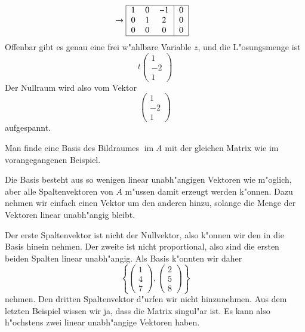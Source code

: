 \begin{beispiel}
\begin{align*}
&\rightarrow
\begin{tabular}{|>{$}c<{$}>{$}c<{$}>{$}c<{$}|>{$}c<{$}|}
\hline
 1& 0& -1&0\\
 0& 1&  2&0\\
 0& 0&  0&0\\
\hline
\end{tabular}
\end{align*}
Offenbar gibt es genau eine frei w"ahlbare Variable $z$, und
die L"osungsmenge ist 
\[
t\begin{pmatrix}
1\\-2\\1
\end{pmatrix}
\]
Der Nullraum wird also vom Vektor
\[
\begin{pmatrix}
1\\-2\\1
\end{pmatrix}
\]
aufgespannt.
\end{beispiel}

\begin{beispiel}
Man finde eine Basis des Bildraumes $\operatorname{im}A$ mit der gleichen
Matrix wie im vorangegangenen Beispiel.

Die Basis besteht aus so wenigen linear unabh"angigen Vektoren wie
m"oglich, aber alle Spaltenvektoren von $A$ m"ussen damit erzeugt
werden k"onnen.
Dazu nehmen wir einfach einen Vektor um den anderen
hinzu, solange die Menge der Vektoren linear unabh"angig bleibt.

Der erste Spaltenvektor ist nicht der Nullvektor, also k"onnen wir
den in die Basis hinein nehmen.
Der zweite ist nicht proportional,
also sind die ersten beiden Spalten linear unabh"angig.
Als
Basis k"onnten wir daher
\[
\left\{
\begin{pmatrix}1\\4\\7\end{pmatrix}
,
\begin{pmatrix}2\\5\\8\end{pmatrix}
\right\}
\]
nehmen.
Den dritten Spaltenvektor d"urfen wir nicht hinzunehmen.
Aus dem letzten Beispiel wissen wir ja, dass die Matrix singul"ar
ist.
Es kann also h"ochstens zwei linear unabh"angige Vektoren haben.
\end{beispiel}

